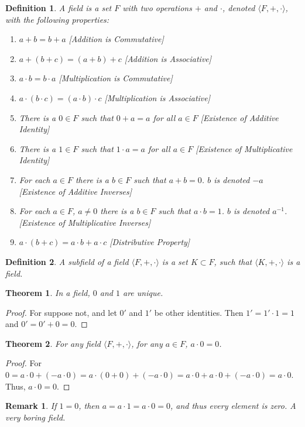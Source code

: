 \documentclass[crop=false,class=book]{standalone}
\theoremstyle{mystyle}
\newtheorem{theorem}{Theorem}[section]
\newtheorem{definition}{Definition}[section]
\newtheorem{remark}{Remark}[section]
\begin{document}
\begin{definition}
A field is a set $F$ with two operations $+$ and $\cdot$, denoted $\langle F, +,\cdot \rangle$, with the following properties:
\begin{enumerate}
\item $a+b=b+a$ \hfill [Addition is Commutative]
\item $a+(b+c)=(a+b)+c$ \hfill [Addition is Associative]
\item $a\cdot b = b\cdot a$ \hfill [Multiplication is Commutative]
\item $a\cdot (b\cdot c) = (a\cdot b)\cdot c$ \hfill [Multiplication is Associative]
\item There is a $0\in F$ such that $0+a=a$ for all $a\in F$ \hfill [Existence of Additive Identity]
\item There is a $1\in F$ such that $1\cdot a = a$ for all $a\in F$ \hfill [Existence of Multiplicative Identity]
\item For each $a\in F$ there is a $b\in F$ such that $a+b = 0$. $b$ is denoted $-a$ \hfill [Existence of Additive Inverses]
\item For each $a\in F$, $a\ne 0$ there is a $b\in F$ such that $a\cdot b = 1$. $b$ is denoted $a^{-1}$. \hfill [Existence of Multiplicative Inverses]
\item $a\cdot(b+c) = a\cdot b + a\cdot c$ \hfill [Distributive Property]
\end{enumerate}
\end{definition}
\begin{definition}
A subfield of a field $\langle F,+,\cdot \rangle$ is a set $K\subset F$, such that $\langle K, +,\cdot \rangle$ is a field.
\end{definition}
\begin{theorem}
In a field, $0$ and $1$ are unique.
\end{theorem}
\begin{proof}
For suppose not, and let $0'$ and $1'$ be other identities. Then $1'=1'\cdot 1 = 1$ and $0'=0'+0=0$.
\end{proof}
\begin{theorem}
For any field $\langle F,+,\cdot \rangle$, for any $a\in F$, $a\cdot 0 = 0$.
\end{theorem}
\begin{proof}
For $0 = a\cdot 0 + (-a\cdot 0) = a\cdot(0+0) +(-a\cdot 0) = a\cdot 0 + a\cdot 0 + (-a\cdot 0) = a\cdot 0$. Thus, $a\cdot 0 = 0$.
\end{proof}
\begin{remark}
If $1=0$, then $a=a\cdot 1 = a\cdot 0 = 0$, and thus every element is zero. A very boring field.
\end{remark}
\end{document}
